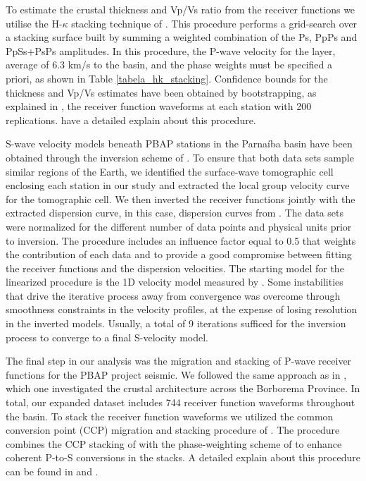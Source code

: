 \documentclass[paper,11pt]{geophysics}
\begin{document}
To estimate the crustal thickness and Vp/Vs ratio from the receiver functions we utilise the H-$\kappa$ stacking technique of \cite{zhu_moho_2000}. This procedure performs a grid-search  over a stacking surface built by summing a weighted combination of the Ps, PpPs and PpSs+PsPs amplitudes. In this procedure, the P-wave velocity for the layer, average of 6.3 km/s to the basin, and the phase weights must be specified a priori, as shown in Table \ref{tabela_hk_stacking}. Confidence  bounds for the thickness and Vp/Vs estimates have been obtained by bootstrapping, as explained in  \cite{efron_statistical_1991}, the receiver function waveforms at each station with 200 replications. \cite{luz_bulk_2015} have a detailed explain about this procedure.

S-wave velocity models beneath PBAP stations in the Parnaíba basin have been obtained through the inversion scheme of \cite{julia_joint_2000}. To ensure that both data sets sample similar regions of the Earth, we identified the surface-wave tomographic cell enclosing each station in our study and extracted the local group velocity curve for the tomographic cell. We then inverted the receiver functions jointly with the extracted dispersion curve, in this case, dispersion curves from \cite{feng_upper_2007}. The data sets were normalized for the different number of data points and physical units prior to inversion. The procedure includes an influence factor equal to 0.5 that weights the contribution of each data and to provide a good compromise between fitting the receiver functions and the dispersion velocities. The starting model for the linearized procedure is the 1D velocity model measured by \cite{almeida_crustal_2015}. Some instabilities that drive the iterative process away from convergence was overcome through smoothness constraints in the velocity profiles, at the expense of losing resolution in the inverted models. Usually, a total of 9 iterations sufficed for the inversion process to converge to a final S-velocity model.

The final step in our analysis was the migration and stacking of P-wave receiver functions for the PBAP project seismic. We followed the same approach as in \cite{almeida_crustal_2015}, which one investigated the crustal architecture across the
Borborema Province. In total, our expanded dataset includes 744 receiver function waveforms throughout the basin. To stack the receiver function waveforms we utilized the common conversion point (CCP) migration and stacking procedure of \cite{frassetto_improved_2010}. The procedure combines the CCP stacking of \cite{gilbert_images_2004} with the phase-weighting scheme of \cite{schimmel_noise_1997} to enhance coherent P-to-S conversions in the stacks. A detailed explain about this
procedure can be found in \cite{frasseto_receiver_2013} and \cite{almeida_crustal_2015}.
\end{document}
